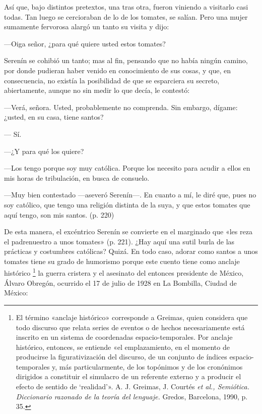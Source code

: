 \documentclass[14pt,twoside,final]{extbook} %
\let\oldfootnote\footnote
\renewcommand\footnote[1]{%
\oldfootnote{\hspace{1mm}#1}}
\begin{document}
Así que, bajo distintos pretextos, una tras otra, fueron viniendo a visitarlo casi todas. Tan luego se cercioraban de lo de los tomates, se salían. Pero una mujer sumamente fervorosa alargó un tanto su visita y dijo:
\begin{quoting}
---Oiga señor, ¿para qué quiere usted estos tomates?

Serenín se cohibió un tanto; mas al fin, pensando que no había ningún camino, por donde pudieran haber venido en conocimiento de sus cosas, y que, en consecuencia, no existía la posibilidad de que se esparciera su secreto, abiertamente, aunque no sin medir lo que decía, le contestó:

---Verá, señora. Usted, probablemente no comprenda. Sin embargo, dígame: ¿usted, en su casa, tiene santos?

--- Sí.

---¿Y para qué los quiere?

---Los tengo porque soy muy católica. Porque los necesito para acudir a ellos en mis horas de tribulación, en busca de consuelo.

---Muy bien contestado ---aseveró Serenín---. En cuanto a mí, le diré que, pues no soy católico, que tengo una religión distinta de la suya, y que estos tomates que aquí tengo, son mis santos. (p. 220)
\end{quoting}
De esta manera, el excéntrico Serenín se convierte en el marginado que «les reza el padrenuestro a unos tomates» (p. 221). ¿Hay aquí una sutil burla de las prácticas y costumbres católicas? Quizá. En todo caso, adorar como santos a unos tomates tiene su grado de humorismo porque este cuento tiene como anclaje histórico\footnote{El término «anclaje histórico» corresponde a Greimas, quien considera que todo discurso que relata series de eventos o de hechos necesariamente está inscrito en un sistema de coordenadas \mbox{espacio-temporales}. Por anclaje histórico, entonces, se entiende «el emplazamiento, en el momento de producirse la figurativización del discurso, de un conjunto de índices espacio-temporales y, más particularmente, de los topónimos y de los cronónimos dirigidos a constituir el simulacro de un referente externo y a producir el efecto de sentido de `realidad'». A. J. Greimas, J. Courtés \textit{et al., Semiótica. Diccionario razonado de la teoría del lenguaje.} Gredos, Barcelona, 1990, p. 35.} la guerra cristera y el asesinato del entonces presidente de México, Álvaro Obregón, ocurrido el 17 de julio de 1928 en La Bombilla, Ciudad de México:
\end{document}
